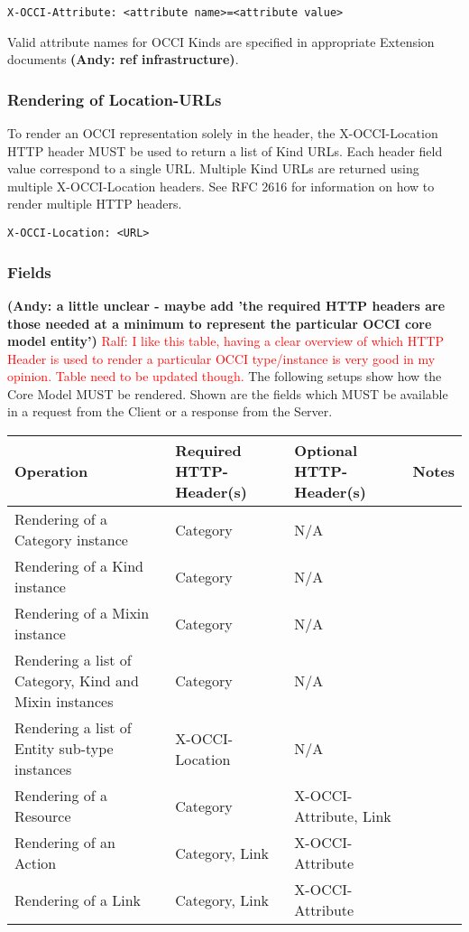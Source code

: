 \documentclass[10pt,a4paper]{article}
\newcommand{\ralf}[1]{\textcolor{red}{Ralf: #1}}
\begin{document}
\begin{verbatim}
X-OCCI-Attribute: <attribute name>=<attribute value>
\end{verbatim}

Valid attribute names for OCCI Kinds are specified in appropriate
Extension documents \textbf{(Andy: ref infrastructure)}.

\subsubsection{Rendering of Location-URLs}
To render an OCCI representation solely in the header, the
X-OCCI-Location HTTP header MUST be used to return a list of Kind
URLs. Each header field value correspond to a single URL. Multiple
Kind URLs are returned using multiple X-OCCI-Location headers. See RFC
2616 for information on how to render multiple HTTP headers.

\begin{verbatim}
X-OCCI-Location: <URL>
\end{verbatim}

\subsubsection{Fields}
\textbf{(Andy: a little unclear - maybe add 'the required HTTP headers are
 those needed at a minimum to represent the particular OCCI core model entity')}
\ralf{I like this table, having a clear overview of which HTTP Header is used
to render a particular OCCI type/instance is very good in my opinion. Table need
to be updated though.}
The following setups show how the Core Model MUST be rendered. Shown
are the fields which MUST be available in a request from the Client or
a response from the Server.

\begin{tabular}{l|l|l|l}
Operation & Required HTTP-Header(s) & Optional HTTP-Header(s) & Notes \\
\hline
Rendering of a Category instance & Category & N/A & \\
Rendering of a Kind instance & Category & N/A & \\
Rendering of a Mixin instance & Category & N/A & \\
Rendering a list of Category, Kind and Mixin instances & Category & N/A & \\
Rendering a list of Entity sub-type instances & X-OCCI-Location & N/A & \\
Rendering of a Resource & Category & X-OCCI-Attribute, Link & \\
Rendering of an Action & Category, Link & X-OCCI-Attribute & \\
Rendering of a Link & Category, Link & X-OCCI-Attribute & \\
\end{tabular}
\end{document}

